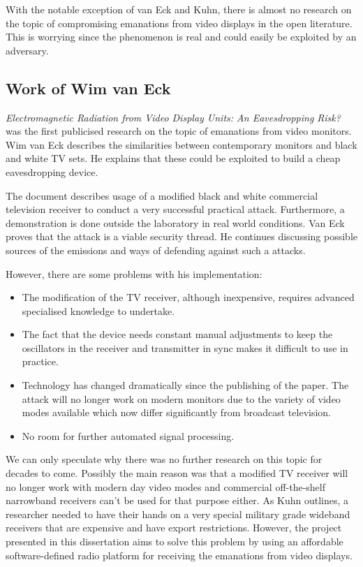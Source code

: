\documentclass[a4paper,12pt,twoside,openright]{report}
\begin{document}
With the notable exception of van Eck and Kuhn, there is almost no research on the topic of compromising emanations from video displays in the open literature. This is worrying since the phenomenon is real and could easily be exploited by an adversary.

\subsection{Work of Wim van Eck}

\textit{Electromagnetic Radiation from Video Display Units: An Eavesdropping Risk?} \cite{van1985electromagnetic} was the first publicised research on the topic of emanations from video monitors. Wim van Eck describes the similarities between contemporary monitors and black and white TV sets. He explains that these could be exploited to build a cheap eavesdropping device.

The document describes usage of a modified black and white commercial television receiver to conduct a very successful practical attack. Furthermore, a demonstration is done outside the laboratory in real world conditions. Van Eck proves that the attack is a viable security thread. He continues discussing possible sources of the emissions and ways of defending against such a attacks.

However, there are some problems with his implementation:

\begin{itemize}

  \item The modification of the TV receiver, although inexpensive, requires advanced specialised knowledge to undertake.
  \item The fact that the device needs constant manual adjustments to keep the oscillators in the receiver and transmitter in sync makes it difficult to use in practice.
  \item Technology has changed dramatically since the publishing of the paper. The attack will no longer work on modern monitors due to the variety of video modes available which now differ significantly from broadcast television. 
  \item No room for further automated signal processing.

\end{itemize}

We can only speculate why there was no further research on this topic for decades to come. Possibly the main reason was that a modified TV receiver will no longer work with modern day video modes and commercial off-the-shelf narrowband receivers can't be used for that purpose either. As Kuhn outlines, a researcher needed to have their hands on a very special military grade wideband receivers that are expensive and have export restrictions\cite{kuhn2003compromising}. However, the project presented in this dissertation aims to solve this problem by using an affordable software-defined radio platform for receiving the emanations from video displays.
 
\end{document}
